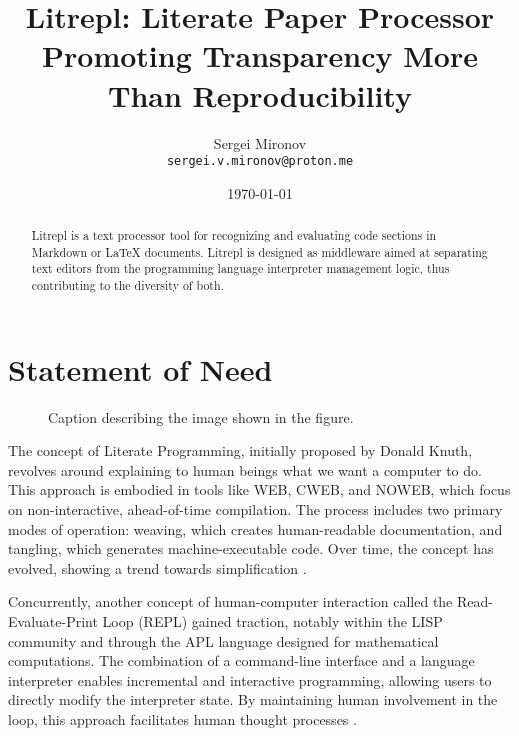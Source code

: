 \documentclass[a4paper,12pt,twocolumn]{article}
\title{Litrepl: Literate Paper Processor Promoting Transparency More Than Reproducibility}
\author{Sergei Mironov \\
        \texttt{sergei.v.mironov@proton.me}}
\date{\today}
\begin{document}
\maketitle

\begin{abstract}
Litrepl is a text processor tool for recognizing and evaluating code sections in
Markdown or LaTeX documents. Litrepl is designed as middleware aimed at
separating text editors from the programming language interpreter management
logic, thus contributing to the diversity of both.
\end{abstract}

\section{Statement of Need}

\begin{figure*}[!hbt]
  \centering
  
  \caption{Caption describing the image shown in the figure.}
  \label{fig:resource-allocation}
\end{figure*}

The concept of Literate Programming, initially proposed by Donald Knuth,
revolves around explaining to human beings what we want a computer to do. This
approach is embodied in tools like WEB, CWEB, and NOWEB, which focus on
non-interactive, ahead-of-time compilation. The process includes two primary
modes of operation: weaving, which creates human-readable documentation, and
tangling, which generates machine-executable code. Over time, the concept has
evolved, showing a trend towards simplification \cite{Knuth1984lp,
Ramsey1994lps}.

Concurrently, another concept of human-computer interaction called the
Read-Evaluate-Print Loop (REPL) gained traction, notably within the LISP
community and through the APL language designed for mathematical computations.
The combination of a command-line interface and a language interpreter enables
incremental and interactive programming, allowing users to directly modify the
interpreter state. By maintaining human involvement in the loop, this approach
facilitates human thought processes \cite{Spence1975apl, McCarthy1959recfun,
Iverson1962apl}.
\end{document}
